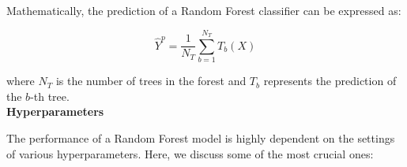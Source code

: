 \documentclass[twocolumn]{article}
\begin{document}
\begin{comment}
\begin{enumerate}
    \item For each tree, a random sample of \( m \) features is selected from the total \( p \) features.
    \item Each tree is grown to the fullest extent possible and no pruning is performed.
    \item The output of the Random Forest is given by the mode of the classifications (for classification tasks) or the mean prediction (for regression tasks) of the individual trees.
\end{enumerate}
\end{comment}
Mathematically, the prediction of a Random Forest classifier can be expressed as:

\begin{equation}
    \hat{Y}^p = \frac{1}{N_T} \sum_{b=1}^{N_T} T_b(X)
\end{equation}

where \( N_T \) is the number of trees in the forest and \( T_b \) represents the prediction of the \( b \)-th tree.\\

\textbf{\large Hyperparameters}

The performance of a Random Forest model is highly dependent on the settings of various hyperparameters. Here, we discuss some of the most crucial ones:
\end{document}
